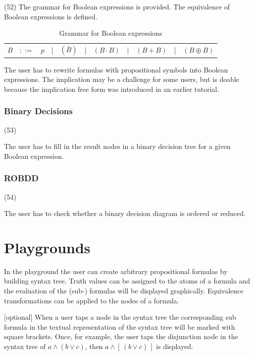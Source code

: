 (52) The grammar for Boolean expressions is provided. 
The equivalence of Boolean expressions is defined.

\begin{table}[htdp]
\begin{center}
\begin{tabular}{rcccccccccc}
$B$	&$::=$	&$p$ 	
	&|		& $(\overline{B})$ 
	&|		&  $(B \cdot B)$ 
	&|		&  $(B + B)$ 
	&|		&  $(B \oplus B)$ \\
\end{tabular}
\caption{Grammar for Boolean expressions}
\label{tab:BNFGRBE}
\end{center}
\end{table}

The user has to rewrite formulas with propositional symbols into Boolean expressions.
The implication may be a challenge for some users, 
but is doable because the implication free form was introduced 
in an earlier tutorial.

\subsubsection{Binary Decisions}
\label{tut:53}

(53)

The user has to fill in the result nodes in a binary decision tree for a given Boolean expression.

\subsubsection{ROBDD}
\label{tut:54}

(54)

The user has to check whether a binary decision diagram is ordered or reduced.

\section{Playgrounds}

In the playground the user can create arbitrary propositional formulas 
by building syntax tree.
Truth values can be assigned to the atoms of a formula and 
the evaluation of the (sub-) formulas will be displayed graphically.
Equivalence transformations can be applied to the nodes of a formula.

[optional]
When a user taps a node in the syntax tree the corresponding sub formula 
in the textual representation of the syntax tree will be marked with square brackets.
Once, for example,  the user taps the disjunction node in the syntax tree of 
$a \wedge (b \vee c) $, then
$a \wedge [\,(b \vee c) \,]$ is displayed.

